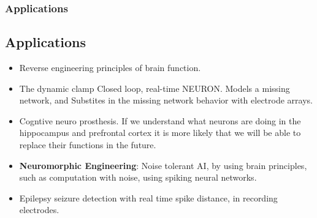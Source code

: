\documentclass{beamer}
\begin{document}

\begin{frame}
\frametitle{Applications}
\subsection{Applications}
\begin{itemize}

\vfill \item Reverse engineering principles of brain function.

\vfill \item The dynamic clamp Closed loop, real-time NEURON. Models a missing network, and Substites in the missing network behavior with electrode arrays. 

\vfill \item Cogntive neuro prosthesis. If we understand what neurons are doing in the hippocampus and prefrontal cortex it is more likely that we will be able to replace their functions in the future.
\vfill \item \textbf{Neuromorphic Engineering}: Noise tolerant AI, by using brain principles, such as computation with noise, using spiking neural networks. 
 
\vfill \item Epilepsy seizure detection with real time spike distance, in recording electrodes.

\end{itemize}
\end{frame}



\end{document}
